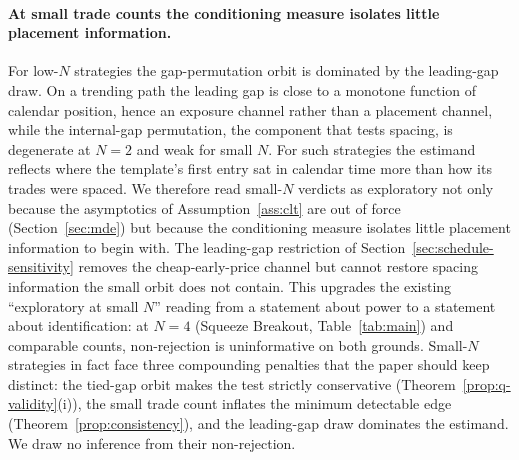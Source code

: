 \documentclass[risks,article,submit,pdftex,oneauthor]{Definitions/mdpi}
\begin{document}
\paragraph{At small trade counts the conditioning measure isolates little placement
information.} For low-$N$ strategies the gap-permutation orbit is dominated by the
leading-gap draw. On a trending path the leading gap is close to a monotone function
of calendar position, hence an exposure channel rather than a placement channel, while
the internal-gap permutation, the component that tests spacing, is degenerate at $N=2$
and weak for small $N$. For such strategies the estimand reflects where the template's
first entry sat in calendar time more than how its trades were spaced. We therefore
read small-$N$ verdicts as exploratory not only because the asymptotics of
Assumption~\ref{ass:clt} are out of force (Section~\ref{sec:mde}) but because the
conditioning measure isolates little placement information to begin with. The
leading-gap restriction of Section~\ref{sec:schedule-sensitivity} removes the
cheap-early-price channel but cannot restore spacing information the small orbit does
not contain. This upgrades the existing ``exploratory at small $N$'' reading from a
statement about power to a statement about identification: at $N=4$ (Squeeze Breakout,
Table~\ref{tab:main}) and comparable counts, non-rejection is uninformative on both
grounds. Small-$N$ strategies in fact face three compounding penalties that the paper
should keep distinct: the tied-gap orbit makes the test strictly conservative
(Theorem~\ref{prop:q-validity}(i)), the small trade count inflates the minimum
detectable edge (Theorem~\ref{prop:consistency}), and the leading-gap draw
dominates the estimand. We draw no inference from their non-rejection.
\end{document}
